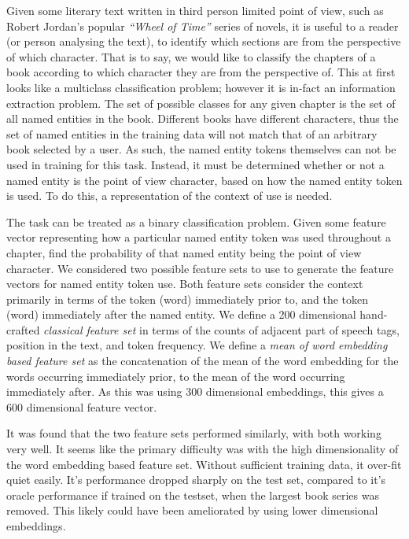 \documentclass{book}
\begin{document}
Given some literary text written in third person limited point of view, such as Robert Jordan's popular \textit{``Wheel of Time''} series of novels,
it is useful to a reader (or person analysing the text), to identify which sections are from the perspective of which character.
That is to say, we would like to classify the chapters of a book according to which character they are from the perspective of.
This at first looks like a multiclass classification problem;
however it is in-fact an information extraction problem.
The set of possible classes for any given chapter is the set of all named entities in the book.
Different books have different characters,
thus the set of named entities in the training data will not match that of an arbitrary book selected by a user.
As such, the named entity tokens themselves can not be used in training for this task.
Instead, it must be determined whether or not a named entity is the point of view character, based on how the named entity token is used.
To do this, a representation of the context of use is needed.


The task can be treated as a binary classification problem.
Given some feature vector representing how a particular named entity token was used throughout a chapter,
find the probability of that named entity being the point of view character.
We considered two possible feature sets to use to generate the feature vectors for named entity token use.
Both feature sets consider the context primarily in terms of the token (word) immediately prior to, and the token (word) immediately after the named entity.
We define a 200 dimensional hand-crafted \emph{classical feature set} in terms of the counts of adjacent part of speech tags, position in the text, and token frequency.
We define a \emph{mean of word embedding based feature set} as the concatenation of the mean of the word embedding for the words occurring immediately prior, to the mean of the word occurring immediately after.
As this was using 300 dimensional embeddings, this gives a 600 dimensional feature vector.


It was found that the two feature sets performed similarly, with both working very well.
It seems like the primary difficulty was with the high dimensionality of the word embedding based feature set.
Without sufficient training data, it over-fit quiet easily.
It's performance dropped sharply on the test set, compared to it's oracle performance if trained on the testset,
when the largest book series was removed.
This likely could have been ameliorated by using lower dimensional embeddings.
\end{document}
